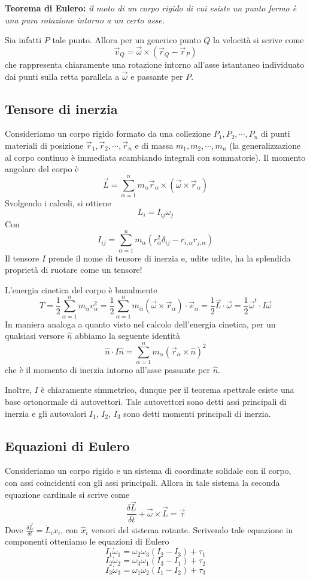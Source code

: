 \documentclass[a4paper,11pt]{article}
\begin{document}
\noindent\textbf{Teorema di Eulero:} \textit{il moto di un corpo rigido di cui esiste un punto fermo è una pura rotazione intorno a un certo asse.}

\noindent Sia infatti $P$ tale punto. Allora per un generico punto $Q$ la velocità si scrive come
\[\vec{v}_Q=\vec{\omega}\times(\vec{r}_Q-\vec{r}_P)\]
che rappresenta chiaramente una rotazione intorno all'asse istantaneo individuato dai punti sulla retta parallela a $\vec{\omega}$ e passante per $P$.


\subsection{Tensore di inerzia}
Consideriamo un corpo rigido formato da una collezione $P_1,P_2,\cdots,P_n$ di punti materiali di posizione $\vec{r}_1,\vec{r}_2,\cdots,\vec{r}_n$ e di massa $m_1,m_2,\cdots,m_n$ (la generalizzazione al corpo continuo è immediata scambiando integrali con sommatorie). Il momento angolare del corpo è
\[\vec{L}=\sum_{\alpha=1}^{n}m_{\alpha}\vec{r}_\alpha\times\left(\vec \omega\times\vec{r}_\alpha\right)\]
Svolgendo i calcoli, si ottiene
\[L_i=I_{ij}\omega_j\]
Con
\[I_{ij}=\sum_{\alpha=1}^{n}m_\alpha\left(r^2_{\alpha}\delta_{ij}-r_{i,\alpha}r_{j,\alpha}\right)\]
Il tensore $I$ prende il nome di tensore di inerzia e, udite udite, ha la splendida proprietà di ruotare come un tensore!

\noindent L'energia cinetica del corpo è banalmente
\[T=\frac{1}{2}\sum_{\alpha=1}^{n}m_\alpha v^2_\alpha=\frac{1}{2}\sum_{\alpha=1}^{n}m_\alpha \left(\vec{\omega}\times\vec{r}_\alpha \right)\cdot\vec{v}_\alpha=\frac{1}{2}\vec{L}\cdot\vec{\omega}=\frac{1}{2}\vec{\omega}^t\cdot I\vec{\omega}\]
In maniera analoga a quanto visto nel calcolo dell'energia cinetica, per un qualsiasi versore $\hat{n}$ abbiamo la seguente identità
\[\hat{n}\cdot I\hat{n}=\sum_{\alpha=1}^{n}m_\alpha\left(\vec{r}_\alpha\times\hat{n}\right)^2\]
che è il momento di inerzia intorno all'asse passante per $\hat{n}$.

\noindent Inoltre, $I$ è chiaramente simmetrico, dunque per il teorema spettrale esiste una base ortonormale di autovettori. Tale autovettori sono detti assi principali di inerzia e gli autovalori $I_1$, $I_2$, $I_3$ sono detti momenti principali di inerzia.

\subsection{Equazioni di Eulero}
Consideriamo un corpo rigido e un sistema di coordinate solidale con il corpo, con assi coincidenti con gli assi principali. Allora in tale sistema la seconda equazione cardinale si scrive come
\[\frac{\delta \vec{L}}{\delta t}+\vec{\omega}\times\vec{L}=\vec{\tau}\]
Dove $\frac{\delta\vec{L}}{\delta t}=\dot{L}_i\hat{x_i}$, con $\hat{x}_i$ versori del sistema rotante.
Scrivendo tale equazione in componenti otteniamo le equazioni di Eulero
\[I_1\dot{\omega}_1=\omega_2\omega_3\left(I_2-I_3\right)+\tau_1\]
\[I_2\dot{\omega}_2=\omega_3\omega_1\left(I_3-I_1\right)+\tau_2\]
\[I_3\dot{\omega}_3=\omega_1\omega_2\left(I_1-I_2\right)+\tau_3\]
\end{document}
